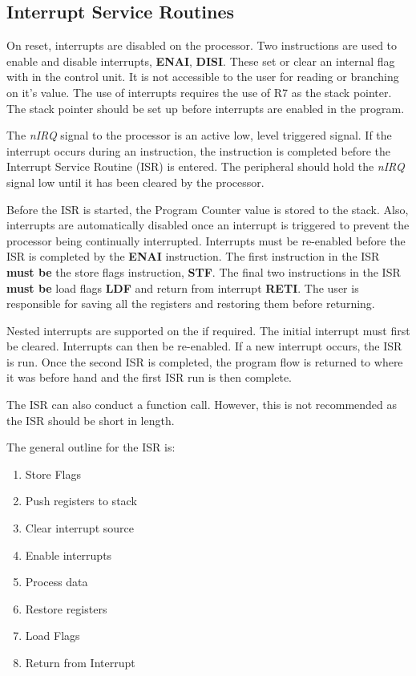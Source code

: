 \subsection{Interrupt Service Routines}

On reset, interrupts are disabled on the \samurai{} processor.
Two instructions are used to enable and disable interrupts, \textbf{ENAI}, \textbf{DISI}.
These set or clear an internal flag with in the control unit. 
It is not accessible to the user for reading or branching on it's value.
The use of interrupts requires the use of R7 as the stack pointer. 
The stack pointer should be set up before interrupts are enabled in the program.

The \textit{nIRQ} signal to the \samurai{} processor is an active low, level triggered signal.
If the interrupt occurs during an instruction, the instruction is completed before the Interrupt Service Routine (ISR) is entered.
The peripheral should hold the \textit{nIRQ} signal low until it has been cleared by the processor.

Before the ISR is started, the Program Counter value is stored to the stack. 
Also, interrupts are automatically disabled once an interrupt is triggered to prevent the processor being continually interrupted.
Interrupts must be re-enabled before the ISR is completed by the \textbf{ENAI} instruction.
The first instruction in the ISR \textbf{must be} the store flags instruction, \textbf{STF}. 
The final two instructions in the ISR \textbf{must be} load flags \textbf{LDF} and return from interrupt \textbf{RETI}. 
The user is responsible for saving all the registers and restoring them before returning. 

Nested interrupts are supported on the \samurai{} if required. 
The initial interrupt must first be cleared. 
Interrupts can then be re-enabled. 
If a new interrupt occurs, the ISR is run. 
Once the second ISR is completed, the program flow is returned to where it was before hand and the first ISR run is then complete.

The ISR can also conduct a function call. 
However, this is not recommended as the ISR should be short in length.

The general outline for the ISR is:
\begin{enumerate}
\item Store Flags
\item Push registers to stack
\item Clear interrupt source
\item Enable interrupts
\item Process data
\item Restore registers
\item Load Flags
\item Return from Interrupt
\end{enumerate}

